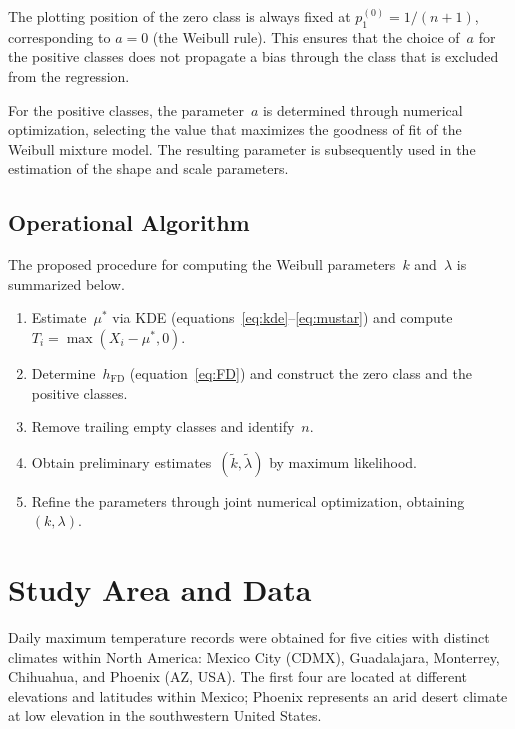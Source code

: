 \documentclass[APA,STIX1COL]{WileyNJD-v2}
\begin{document}
\medskip
The plotting position of the zero class is always fixed at
$p_1^{(0)}=1/(n+1)$, corresponding to $a=0$ (the Weibull rule).
This ensures that the choice of~$a$ for the positive classes does
not propagate a bias through the class that is excluded from the
regression.

For the positive classes, the parameter~$a$ is determined through
numerical optimization, selecting the value that maximizes the
goodness of fit of the Weibull mixture model. The resulting
parameter is subsequently used in the estimation of the shape and
scale parameters.

\subsection{Operational Algorithm}\label{subsec:algoritmo}

The proposed procedure for computing the Weibull
parameters~$k$ and~$\lambda$ is summarized below.

\begin{enumerate}
\item Estimate~$\mu^*$ via KDE
  (equations~\eqref{eq:kde}--\eqref{eq:mustar})
  and compute $T_i=\max(X_i-\mu^*,0)$.
\item Determine~$h_{\mathrm{FD}}$ (equation~\eqref{eq:FD}) and
  construct the zero class and the positive classes.
\item Remove trailing empty classes and identify~$n$.
\item Obtain preliminary estimates~$(\tilde{k},\tilde{\lambda})$
  by maximum likelihood.
\item Refine the parameters through joint numerical optimization,
  obtaining~$(k,\lambda)$.
\end{enumerate}

\section{Study Area and Data}

Daily maximum temperature records were obtained for five cities
with distinct climates within North America: Mexico City (CDMX),
Guadalajara, Monterrey, Chihuahua, and Phoenix (AZ, USA). The
first four are located at different elevations and latitudes
within Mexico; Phoenix represents an arid desert climate at low
elevation in the southwestern United States.
\end{document}
